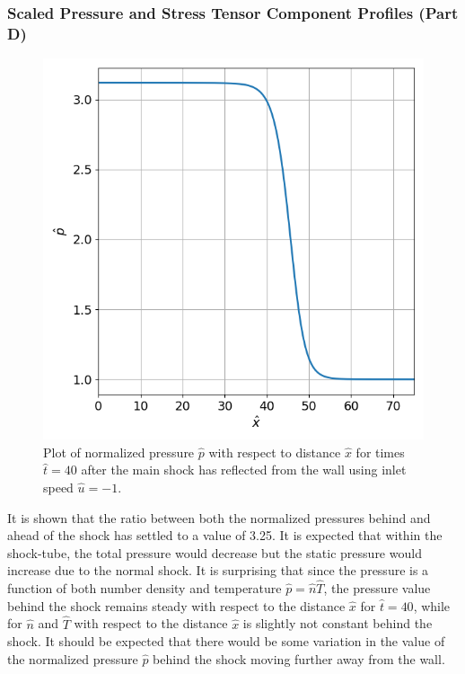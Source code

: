 \documentclass[a4paper]{article}
\begin{document}
\subsubsection{Scaled Pressure and Stress Tensor Component Profiles (Part D)}
\begin{figure}[hbt!]
    \centering
    \includegraphics[width=14cm]{plots/problem_d_p.png}
    \caption{\centering Plot of normalized pressure $\hat{p}$ with respect to distance $\hat{x}$ for times $\hat{t} = 40$ after the main shock has reflected from the wall using inlet speed $\hat{u} = -1$.}
    \label{problem_d_p}
\end{figure}
It is shown that the ratio between both the normalized pressures behind and ahead of the shock has settled to a value of 3.25. It is expected that within the shock-tube, the total pressure would decrease but the static pressure would increase due to the normal shock. It is surprising that since the pressure is a function of both number density and temperature $\hat{p} = \hat{n}\hat{T}$, the pressure value behind the shock remains steady with respect to the distance $\hat{x}$ for $\hat{t} = 40$, while for $\hat{n}$ and $\hat{T}$ with respect to the distance $\hat{x}$ is slightly not constant behind the shock. It should be expected that there would be some variation in the value of the normalized pressure $\hat{p}$ behind the shock moving further away from the wall.
\end{document}
